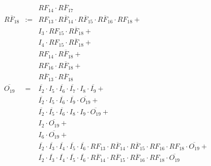 \documentclass[a4paper,russian]{report}
\begin{document}
\begin{eqnarray*}
	& &  RF_{14} \cdotp \overline{RF_{17}} \\
    \overline{RF_{18}} & := & RF_{13} \cdotp \overline{RF_{14}} \cdotp \overline{RF_{15}} \cdotp \overline{RF_{16}} \cdotp RF_{18} + \\
	& &  I_{3} \cdotp RF_{15} \cdotp \overline{RF_{18}} + \\
	& &  I_{4} \cdotp RF_{15} \cdotp \overline{RF_{18}} + \\
	& &  RF_{14} \cdotp \overline{RF_{18}} + \\
	& &  RF_{16} \cdotp \overline{RF_{18}} + \\
	& &  \overline{RF_{13}} \cdotp \overline{RF_{18}} \\
    \overline{O_{19}} & = & \overline{I_{2}} \cdotp I_{5} \cdotp \overline{I_{6}} \cdotp \overline{I_{7}} \cdotp I_{8} \cdotp \overline{I_{9}} + \\
	& &  \overline{I_{2}} \cdotp I_{5} \cdotp \overline{I_{6}} \cdotp \overline{I_{9}} \cdotp \overline{O_{19}} + \\
	& &  \overline{I_{2}} \cdotp \overline{I_{5}} \cdotp \overline{I_{6}} \cdotp I_{8} \cdotp I_{9} \cdotp \overline{O_{19}} + \\
	& &  I_{2} \cdotp \overline{O_{19}} + \\
	& &  I_{6} \cdotp \overline{O_{19}} + \\
	& &  \overline{I_{2}} \cdotp \overline{I_{3}} \cdotp \overline{I_{4}} \cdotp \overline{I_{5}} \cdotp \overline{I_{6}} \cdotp RF_{13} \cdotp \overline{RF_{14}} \cdotp \overline{RF_{15}} \cdotp RF_{16} \cdotp RF_{18} \cdotp \overline{O_{19}} + \\
	& &  \overline{I_{2}} \cdotp \overline{I_{3}} \cdotp \overline{I_{4}} \cdotp \overline{I_{5}} \cdotp \overline{I_{6}} \cdotp \overline{RF_{14}} \cdotp \overline{RF_{15}} \cdotp \overline{RF_{16}} \cdotp RF_{18} \cdotp \overline{O_{19}} \\
 \end{eqnarray*}
\pagebreak[1]
\end{document}
